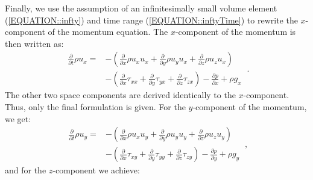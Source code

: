 \documentclass[MathematicsNumericsDerivationsAndOpenFOAM.tex]{subfiles}
\begin{document}
%
%
	Finally, we use the assumption of an infinitesimally small volume element
    (\ref{EQUATION::infty}) and time range (\ref{EQUATION::inftyTime}) to
    rewrite the $x$-component of the momentum equation. The $x$-component
    of the momentum is then written as:
%
%
\begin{equation}\boxed{\begin{aligned}
  \frac{\partial}{\partial t} \rho u_x
=
 &-\left(
      \frac{\partial}{\partial x} \rho u_x u_x
      +\frac{\partial}{\partial y} \rho u_y u_x
      +\frac{\partial}{\partial z} \rho u_z u_x
  \right)\\
 &-\left(
      \frac{\partial}{\partial x}  \tau_{xx}
      +\frac{\partial}{\partial y}  \tau_{yx}
      +\frac{\partial}{\partial z}  \tau_{zx}
  \right)
  -
  \frac{\partial p}{\partial x}
  +
  \rho g_x
  \label{EQUATION::momentumX}
\end{aligned}} ~.\end{equation}
%
%
    The other two space components are derived identically to the $x$-component.
    Thus, only the final formulation is given. For the $y$-component of the
    momentum, we get:
%
%
\begin{equation}\boxed{\begin{aligned}
  \frac{\partial}{\partial t} \rho u_y
=
 &-\left(
      \frac{\partial}{\partial x} \rho u_x u_y
      +\frac{\partial}{\partial y} \rho u_y u_y
      +\frac{\partial}{\partial z} \rho u_z u_y
  \right)\\
 &-\left(
      \frac{\partial}{\partial x}  \tau_{xy}
      +\frac{\partial}{\partial y}  \tau_{yy}
      +\frac{\partial}{\partial z}  \tau_{zy}
  \right)
  -
  \frac{\partial p}{\partial y}
  +
  \rho g_y
  \label{EQUATION::momentumY}
\end{aligned}}~,
\end{equation}
%
%
	and for the $z$-component we achieve:
%
%
\end{document}
